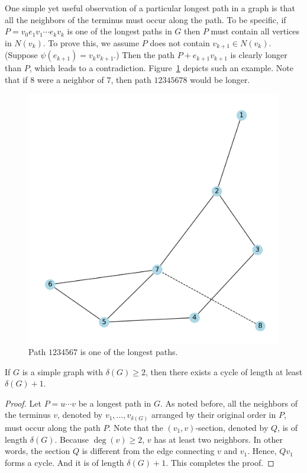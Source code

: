 \documentclass[thmcnt=section, 12pt, color=cyan]{my-elegantbook}
\begin{document}
One simple yet useful observation of a particular longest path 
in a graph is that all the neighbors of the terminus must 
occur along the path. To be specific, 
if $P = v_0 e_1 v_1 \cdots e_k v_k$ is one of the longest paths in $G$ 
then $P$ must contain all vertices in $N(v_k)$. 
To prove this, we assume $P$ does not contain $v_{k+1} \in N(v_k)$. 
(Suppose $\psi(e_{k+1}) = v_k v_{k+1}$.) 
Then the path $P + e_{k+1}v_{k+1}$ is clearly longer than $P$, 
which leads to a contradiction. 
Figure~\ref{fig:1} depicts such an example. 
Note that if $8$ were a neighbor of $7$, 
then path $12345678$ would be longer.

\begin{figure}[ht]
    \centering
    \includegraphics[scale=0.5]{figures/g-001.png}
    \caption{Path $1234567$ is one of the longest paths.}
    \label{fig:1}
\end{figure}


\begin{proposition} \label{pro:5}
    If $G$ is a simple graph with $\delta(G) \geq 2$, 
	then there exists a cycle of length 
	at least $\delta(G)+1$.
\end{proposition}

\begin{proof}
	Let $P = u \cdots v$ 
	be a longest path in $G$.
	As noted before, all the neighbors of 
	the terminus $ v $,
	denoted by $v_1, \ldots, v_{\delta(G)}$
	arranged by their original order in $P$,
	must occur along the path $P$.
	Note that the $(v_1, v)$-section,
	denoted by $Q$,
	is of length $\delta(G)$.
	Because $\deg(v) \geq 2$, 
	$v$ has at least two neighbors. 
	In other words,
	the section $Q$ is different from the edge 
	connecting $v$ and $v_1$.
	Hence, $Q v_1$ forms a cycle.
	And it is of length $\delta(G) + 1$.
	This completes the proof.
\end{proof}
\end{document}

